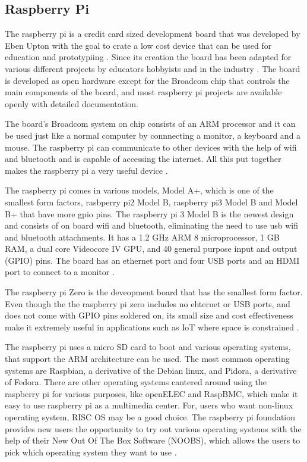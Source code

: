 \documentclass[sigconf]{acmart}
\begin{document}
\subsection{Raspberry Pi}

The raspberry pi is a credit card sized development board that was developed by Eben Upton with the goal to crate a low cost device that can be used for education and prototypiing \cite{os-pi}. Since its creation the board has been adapted for various different projects by educators hobbyists and in the industry \cite{pi-official}. The board is developed as open hardware except for the Broadcom chip that controls the main components of the board, and most raspberry pi projects are available openly with detailed documentation.

The board's Broadcom system on chip consists of an ARM processor and it can be used just like a normal computer by connnecting a monitor, a keyboard and a mouse. The raspberry pi can communicate to other devices with the help of wifi and bluetooth and is capable of accessing the internet. All this put together makes the raspberry pi a very useful device \cite{pi-official}.

The raspberry pi comes in various models, Model A+, which is one of the smallest form factors, rasbperry pi2 Model B, raspberry pi3 Model B and Model B+ that have more gpio pins. The raspberry pi 3 Model B is the newest design and consists of on board wifi and bluetooth, eliminating the need to use usb wifi and bluetooth attachments. It has a 1.2 GHz ARM 8 microprocessor, 1 GB RAM, a dual core Videocore IV GPU, and 40 general purpose input and output (GPIO) pins. The board has an ethernet port and four USB ports and an HDMI port to connect to a monitor \cite{pi-compare}\cite{element-compare}.

The raspberry pi Zero is the deveopment board that has the smallest form factor. Even though the the raspberry pi zero includes no ehternet or USB ports, and does not come with GPIO pins soldered on, its small size and cost effectiveness make it extremely useful in applications such as IoT where space is constrained \cite{official-pi-zero}.

The raspberry pi uses a micro SD card to boot and various operating systems, that support the ARM architecture can be used. The most common operating systems are Raspbian, a derivative of the Debian linux, and Pidora, a derivative of Fedora. There are other operating systems cantered around using the raspberry pi for various purposes, like openELEC and RaspBMC, which make it easy to use raspberry pi as a multimedia center. For, users who want non-linux operating system, RISC OS may be a good choice. The raspberry pi foundation provides new users the opportunity to try out various operating systems with the help of their New Out  Of The Box Software (NOOBS), which allows the users to pick which operating system they want to use \cite{os-pi}.
\end{document}
